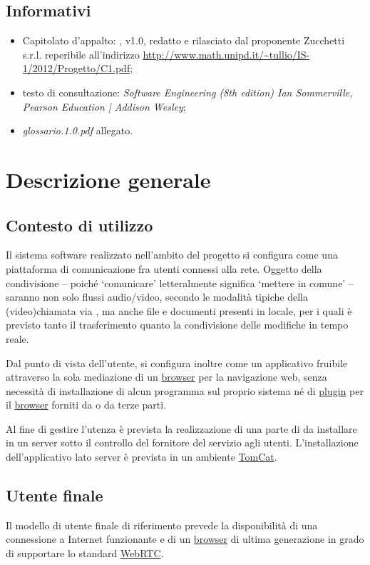 \subsection{Informativi}
\begin{itemize}
\item[] Capitolato d'appalto: \caName{}, v1.0, redatto e rilasciato dal proponente Zucchetti s.r.l. reperibile all'indirizzo \url{http://www.math.unipd.it/~tullio/IS-1/2012/Progetto/C1.pdf};
\item[] testo di consultazione: \textit{Software Engineering (8th edition) Ian Sommerville, Pearson Education | Addison Wesley};
\item[] \textit{glossario.1.0.pdf} allegato.
\end{itemize}

\clearpage
\section{Descrizione generale}

\subsection{Contesto di utilizzo}
Il sistema software realizzato nell'ambito del progetto \caName{} si configura come una piattaforma di comunicazione fra utenti connessi alla rete. Oggetto della condivisione -- poiché `comunicare' letteralmente significa `mettere in comune' -- saranno non solo flussi audio/video, secondo le modalità tipiche della (video)chiamata via , ma anche file e documenti presenti in locale, per i quali è previsto tanto il trasferimento quanto la condivisione delle modifiche in tempo reale.

Dal punto di vista dell'utente, \caName{} si configura inoltre come un applicativo fruibile attraverso la sola mediazione di un \underline{browser} per la navigazione web, senza necessità di installazione di alcun programma  sul proprio sistema né di \underline{plugin} per il \underline{browser} forniti da \team{} o da terze parti.

Al fine di gestire l'utenza è prevista la realizzazione di una parte di  da installare in un server sotto il controllo del fornitore del servizio agli utenti. L'installazione dell'applicativo lato server è prevista in un ambiente \underline{TomCat}.

\subsection{Utente finale}
Il modello di utente finale di riferimento prevede la disponibilità di una connessione a Internet funzionante e di un \underline{browser} di ultima generazione in grado di supportare lo standard \underline{WebRTC}.

